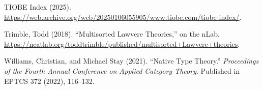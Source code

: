 \documentclass{article}
\begin{document}
\begin{thebibliography}{99}
TIOBE Index (2025). 
\url{https://web.archive.org/web/20250106055905/www.tiobe.com/tiobe-index/}.

Trimble, Todd (2018). 
``Multisorted Lawvere Theories,'' on the nLab. 
\url{https://ncatlab.org/toddtrimble/published/multisorted+Lawvere+theories}.

Williams, Christian, and Michael Stay (2021). 
``Native Type Theory.''  
\emph{Proceedings of the Fourth Annual Conference on Applied Category Theory}.  
Published in EPTCS 372 (2022), 116--132.

\end{thebibliography}
\end{document}
